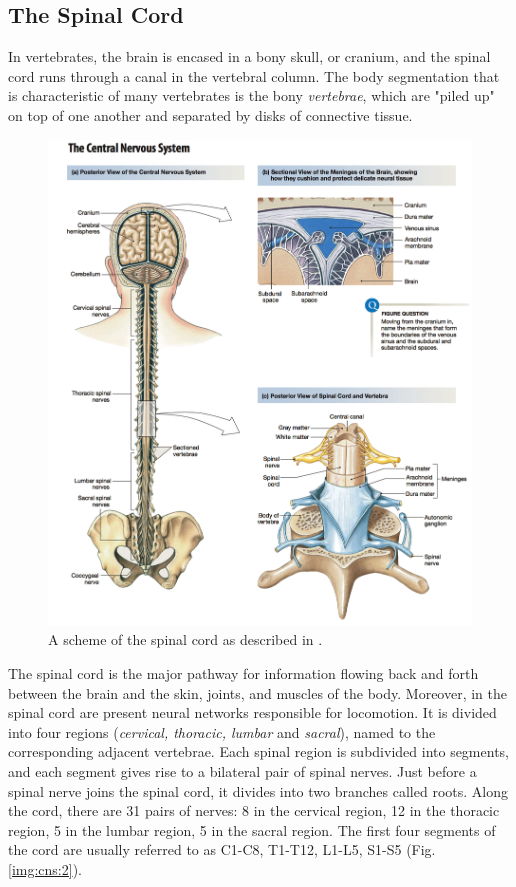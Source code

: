 \documentclass[a4paper,11pt,oneside]{book}
\begin{document}
\subsection{The Spinal Cord}
In vertebrates, the brain is encased in a bony skull, or cranium, and the spinal cord runs through a canal in the vertebral column. The body segmentation that is characteristic of many vertebrates is the bony \emph{vertebrae}, which are "piled up" on top of one another and separated by disks of connective tissue. 

\newpage

\begin{figure}[h!]
\centering
\includegraphics[width=\textwidth]{images/spinal_cord}
\caption{A scheme of the spinal cord as described in \cite{silverthorn}.}
\label{img:cns:1}
\end{figure}

\newpage

The spinal cord is the major pathway for information flowing back and forth between the brain and the skin, joints, and muscles of the body. Moreover, in the spinal cord are present neural networks responsible for locomotion. It is divided into four regions (\emph{cervical, thoracic, lumbar} and \emph{sacral}), named to the corresponding adjacent vertebrae. Each spinal region is subdivided into segments, and each segment gives rise to a bilateral pair of spinal nerves. Just before a spinal nerve joins the spinal cord, it divides into two branches called roots. Along the cord, there are 31 pairs of nerves: 8 in the cervical region, 12 in the thoracic region, 5 in the lumbar region, 5 in the sacral region. The first four segments of the cord are usually referred to as C1-C8, T1-T12, L1-L5, S1-S5 (Fig. \ref{img:cns:2}).
\end{document}
